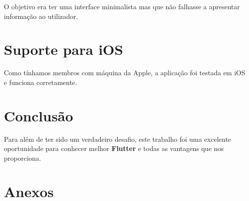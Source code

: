 \documentclass[11pt]{article}
\begin{document}
	O objetivo era ter uma interface minimalista mas que não falhasse a apresentar informação ao utilizador.


	\large
	\section{Suporte para iOS}
	\normalsize
	
	Como tínhamos membros com máquina da Apple, a aplicação foi testada em iOS e funciona corretamente.
	

	\large
	\section{Conclusão}
	\normalsize
	
	Para além de ter sido um verdadeiro desafio, este trabalho foi uma excelente oportunidade para conhecer melhor \textbf{Flutter} e todas as vantagens que nos proporciona.
	

	\large
	\section{Anexos}
	\normalsize
	
	\listoffigures
	\lstlistoflistings
\end{document}
